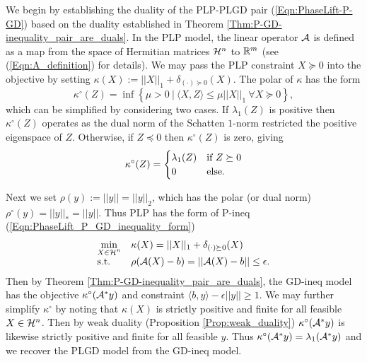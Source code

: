 We begin by establishing the duality of the PLP-PLGD pair (\ref{Eqn:PhaseLift-P-GD}) based on the duality established in Theorem \ref{Thm:P-GD-inequality_pair_are_duals}.  In the PLP model, the linear operator ${\mathcal A}$ is defined as a map from the space of Hermitian matrices ${\mathcal H}^n$ to ${\mathbb R}^m$ (see (\ref{Eqn:A_definition}) for details).  We may pass the PLP constraint $X \succeq 0$ into the objective by setting $\kappa(X) := ||X||_1 + \delta_{(\cdot) \succeq 0}(X)$.  The polar of $\kappa$ has the form  
\[
\kappa^\circ(Z) = \inf \left\{ \mu > 0 \ | \ \langle X, Z \rangle \leq \mu ||X||_1 \ \forall X \succeq 0 \right\},
\]
which can be simplified by considering two cases. If $\lambda_1(Z)$ is positive then $\kappa^\circ(Z)$ operates as the dual norm of the Schatten $1$-norm restricted the positive eigenspace of $Z$.  Otherwise, if $Z \preceq 0$ then $\kappa^\circ(Z)$ is zero, giving
\begin{equation}			\label{Eqn:kappa_polar}
\kappa^\circ(Z) = 
	\begin{cases}
		\lambda_1(Z)	&	\textnormal{if } Z \succeq 0	\\
		0	&	\textnormal{else}.
	\end{cases}
\end{equation}

Next we set $\rho(y) := ||y||= ||y||_2$, which has the polar (or dual norm) $\rho^\circ(y) = ||y||_* = ||y||$.  Thus PLP has the form of P-ineq (\ref{Eqn:PhaseLift_P_GD_inequality_form})
\begin{equation*} 			
\begin{array}{ll}
		\min\limits_{\substack{X \in {\mathcal H}^n}}
		&	\kappa(X) = ||X||_1 + \delta_{(\cdot) \succeq 0}(X)
						\\

		\textnormal{s.t.}
		& 	\rho({\mathcal A}(X)-b) = ||{\mathcal A}(X) - b|| \leq \epsilon.
\end{array}
\end{equation*}
Then by Theorem \ref{Thm:P-GD-inequality_pair_are_duals}, the GD-ineq model has the objective $\kappa^\circ({\mathcal A}^*y)$ and constraint $\langle b, y \rangle - \epsilon ||y|| \geq 1$.  We may further simplify $\kappa^\circ$ by noting that $\kappa(X)$ is strictly positive and finite for all feasible $X \in {\mathcal H}^n$.  Then by weak duality (Proposition \ref{Prop:weak_duality}) $\kappa^\circ({\mathcal A}^*y)$ is likewise strictly positive and finite for all feasible $y$.  Thus $\kappa^\circ({\mathcal A}^*y) = \lambda_1({\mathcal A}^*y)$ and we recover the PLGD model from the GD-ineq model.







